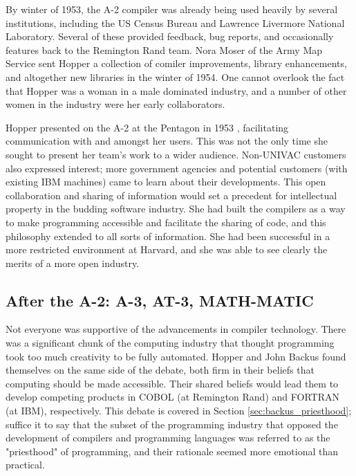 By winter of 1953, the A-2 compiler was already being used heavily
by several institutions, including the US Census Bureau and
Lawrence Livermore National Laboratory.
Several of these provided feedback, bug reports, and occasionally features
back to the Remington Rand team.
Nora Moser of the Army Map Service sent Hopper a collection of comiler
improvements, library enhancements, and altogether new libraries in the
winter of 1954.
One cannot overlook the fact that Hopper was a woman in a male dominated
industry, and a number of other women in the industry were her early
collaborators.

Hopper presented on the A-2 at the Pentagon in 1953
\cite{pentagon_hopper_univac_workshop_1953},
facilitating communication with and amongst her users.
This was not the only time she sought to present her team's work
to a wider audience.
Non-UNIVAC customers also expressed interest; more government
agencies and potential customers (with existing IBM machines)
came to learn about their developments.
This open collaboration and sharing of information would set a precedent
for intellectual property in the budding software industry.
She had built the compilers as a way to make programming accessible
and facilitate the sharing of code, and this philosophy extended to
all sorts of information.
She had been successful in a more restricted environment at Harvard,
and she was able to see clearly the merits of a more open industry.

\subsection{After the A-2: A-3, AT-3, MATH-MATIC}


Not everyone was supportive of the advancements in compiler technology.
There was a significant chunk of the computing industry that thought
programming took too much creativity to be fully automated.
Hopper and John Backus found themselves on the same side of the debate,
both firm in their beliefs that computing should be made accessible.
Their shared beliefs would lead them to develop competing products
in COBOL (at Remington Rand) and FORTRAN (at IBM), respectively.
This debate is covered in Section \ref{sec:backus_priesthood};
suffice it to say that the subset of the programming industry that
opposed the development of compilers and programming languages
was referred to as the "priesthood" of programming, and their
rationale seemed more emotional than practical.

